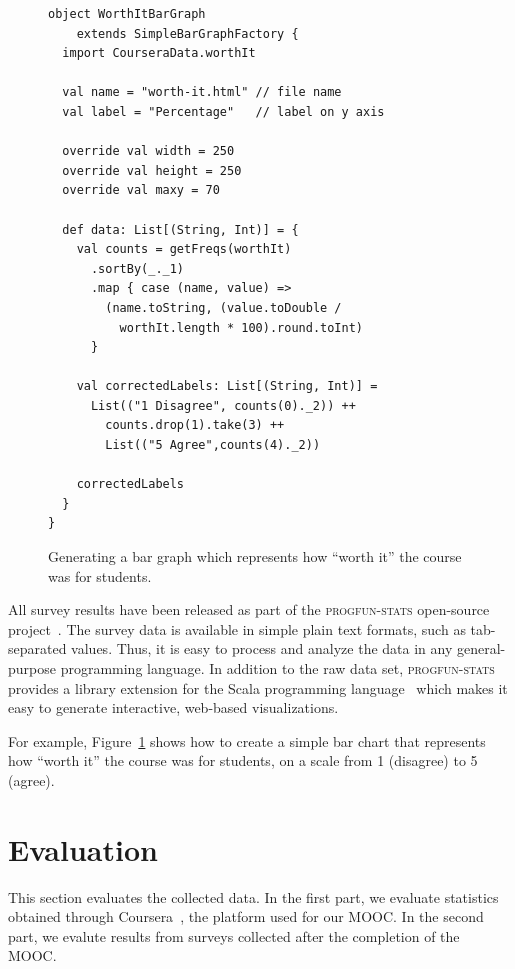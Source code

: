\documentclass{sig-alternate}
\begin{document}
\begin{figure}[ht!]
  \begin{lstlisting}
object WorthItBarGraph
    extends SimpleBarGraphFactory {
  import CourseraData.worthIt

  val name = "worth-it.html" // file name
  val label = "Percentage"   // label on y axis

  override val width = 250
  override val height = 250
  override val maxy = 70

  def data: List[(String, Int)] = {
    val counts = getFreqs(worthIt)
      .sortBy(_._1)
      .map { case (name, value) =>
        (name.toString, (value.toDouble /
          worthIt.length * 100).round.toInt)
      }

    val correctedLabels: List[(String, Int)] =
      List(("1 Disagree", counts(0)._2)) ++
        counts.drop(1).take(3) ++
        List(("5 Agree",counts(4)._2))

    correctedLabels
  }
}
  \end{lstlisting}
  \caption{Generating a bar graph which
    represents how ``worth it'' the course was for students.}

  \label{fig:bar-chart}
\end{figure}

All survey results have been released as part of the \textsc{progfun-stats} open-source
project~\cite{progfun-stats}. The survey data is available in simple
plain text formats, such  as tab-separated values. Thus, it is easy to process
and analyze the data in any general-purpose programming language. In addition
to the raw data set, \textsc{progfun-stats} provides a library extension for
the Scala programming language~\cite{Odersky-Spoon-Venners07} which makes it
easy to generate interactive, web-based visualizations.

For example, Figure~\ref{fig:bar-chart} shows how to create a simple bar chart
that represents how ``worth it'' the course was for students, on a scale from
1 (disagree) to 5 (agree).


\section{Evaluation}\label{sec:eval}

This section evaluates the collected data. In the first part, we evaluate
statistics obtained through Coursera~\cite{coursera}, the platform used for
our MOOC. In the second part, we evalute results from surveys collected after
the completion of the MOOC.
\end{document}
